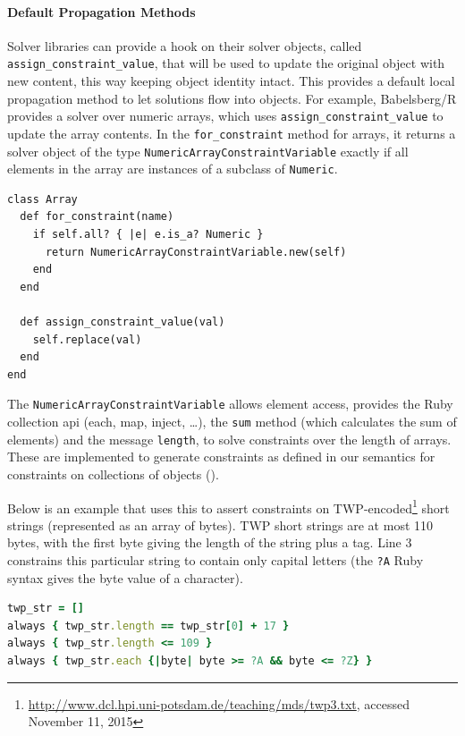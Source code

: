\paragraph*{Default Propagation Methods}
\label{sec:expl-prop-meth}
Solver libraries can provide a hook on their solver objects, called
\lstinline{assign_constraint_value}, that will be used to update the original
object with new content, this way keeping object identity intact. This provides
a default local propagation method to let solutions flow into objects. For
example, Babelsberg/R provides a solver over numeric arrays, which uses
\lstinline{assign_constraint_value} to update the array contents. In the
\lstinline{for_constraint} method for arrays, it returns a solver object of the
type \lstinline{NumericArrayConstraintVariable} exactly if all elements in the
array are instances of a subclass of \lstinline{Numeric}.
\begin{lstlisting}
class Array
  def for_constraint(name)
    if self.all? { |e| e.is_a? Numeric }
      return NumericArrayConstraintVariable.new(self)
    end
  end

  def assign_constraint_value(val)
    self.replace(val)
  end
end
\end{lstlisting}
The \lstinline{NumericArrayConstraintVariable} allows element access, provides
the Ruby collection \ac{api} (each, map, inject, \dots), the \lstinline{sum}
method (which calculates the sum of elements) and the message
\lstinline{length}, to solve constraints over the length of arrays. These are
implemented to generate constraints as defined in our semantics for constraints
on collections of objects ().

Below is an example that uses this to assert constraints on
\textsc{TWP}-encoded\footnote{\url{http://www.dcl.hpi.uni-potsdam.de/teaching/mds/twp3.txt}, accessed November 11, 2015}
short strings (represented as an array of bytes). \textsc{TWP} short strings are
at most 110 bytes, with the first byte giving the length of the string plus a
tag. Line 3 constrains this particular string to contain only capital letters
(the \lstinline{?A} Ruby syntax gives the byte value of a character).
\begin{lstlisting}[language=ruby]
twp_str = []
always { twp_str.length == twp_str[0] + 17 }
always { twp_str.length <= 109 }
always { twp_str.each {|byte| byte >= ?A && byte <= ?Z} }
\end{lstlisting}

